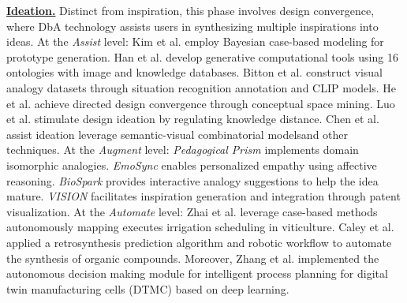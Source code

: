 \textbf{\underline{Ideation.}} Distinct from inspiration, this phase involves design convergence, where DbA technology assists users in synthesizing multiple inspirations into ideas. At the \textit{Assist} level: Kim et al. employ Bayesian case-based modeling for prototype generation\cite{kim2014bayesian}. Han et al. develop generative computational tools using 16 ontologies with image and knowledge databases\cite{han2018computational}. Bitton et al. construct visual analogy datasets through situation recognition annotation and CLIP models\cite{bitton2023vasr}. He et al. achieve directed design convergence through conceptual space mining\cite{he2019mining}. Luo et al. stimulate design ideation by regulating knowledge distance\cite{luo2021guiding}. Chen et al. assist ideation leverage semantic-visual combinatorial models\cite{chen2019artificial}and other techniques\cite{akula2023metaclue, you2018design, shen2022nature}. At the \textit{Augment} level: \textit{Pedagogical Prism} implements domain isomorphic analogies\cite{bettin2023pedagogical}. \textit{EmoSync} enables personalized empathy using affective reasoning\cite{Ju2025toward}. \textit{BioSpark} provides interactive analogy suggestions to help the idea mature\cite{kang2025biospark}. \textit{VISION} facilitates inspiration generation and integration through patent visualization\cite{song2020exploration}. At the \textit{Automate} level: Zhai et al. leverage case-based methods autonomously mapping executes irrigation scheduling in viticulture\cite{zhai2020applying}. Caley et al. applied a retrosynthesis prediction algorithm and robotic workflow to automate the synthesis of organic compounds\cite{coley2019robotic}. Moreover, Zhang et al. implemented the autonomous decision making module for intelligent process planning for digital twin manufacturing cells (DTMC) based on deep learning\cite{zhang2020deep}.


